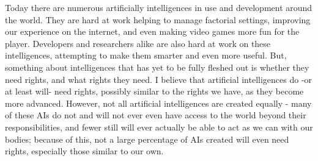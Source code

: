 Today there are numerous artificially intelligences in use and development around the world. They are hard at work helping to manage factorial settings, improving our experience on the internet, and even making video games more fun for the player. Developers and researchers alike are also hard at work on these intelligences, attempting to make them smarter and even more useful. But, something about intelligences that has yet to be fully fleshed out is whether they need rights, and what rights they need. I believe that artificial intelligences do -or at least will- need rights, possibly similar to the rights we have, as they become more advanced. However, not all artificial intelligences are created equally - many of these AIs do not and will not ever even have access to the world beyond their responsibilities, and fewer still will ever actually be able to act as we can with our bodies; because of this, not a large percentage of AIs created will even need rights, especially those similar to our own.